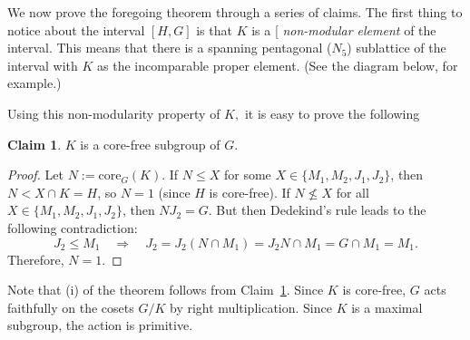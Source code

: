 \documentclass[cm,dissertation,actual,final]{uhthesis}
\theoremstyle{plain}
\theoremstyle{definition}
\newcounter{claim}
\newtheorem{claim}[claim]{Claim}
\theoremstyle{remark}
\numberwithin{theorem}{section}
\numberwithin{claim}{chapter}
\numberwithin{equation}{section}
\numberwithin{conjecture}{chapter}
\newcommand{\<}{\ensuremath{\langle}}
\renewcommand{\>}{\ensuremath{\rangle}}
\renewcommand{\leq}{\ensuremath{\leqslant}}
\renewcommand{\nleq}{\ensuremath{\nleqslant}}
\newcommand{\core}{\ensuremath{\mathrm{core}}}
\newcommand{\0}{\ensuremath{\mathbf{0}}}
\newcommand{\1}{\ensuremath{\mathbf{1}}}
\newcommand{\2}{\ensuremath{\mathbf{2}}}
\newcommand{\3}{\ensuremath{\mathbf{3}}}
\newcommand{\4}{\ensuremath{\mathbf{4}}}
\newcommand{\5}{\ensuremath{\mathbf{5}}}
\newcommand{\indexit}[1]{\index{#1|textit}}
\def\defn#1{\gdef\defnstring{#1}%
  \xdef\dodefnii{{\noexpand\em
       \defnstring}\noexpand\indexit{\defnstring}\noexpand\makeatother}%
  \futurelet\nextthing\dodefn}
\def\dodefn{%
  \ifx\nextthing[\let\next=\dodefni
    \else\let\next=\dodefnii\fi
  \makeatletter
  \next}
\def\dodefni[#1]{%
  {\em\defnstring}%
  \indexit{#1}%
  \makeatother}
\begin{document}
We now prove the foregoing theorem through a series of claims.
The first thing to notice about the interval $[H,G]$ is that
$K$ is a \defn{non-modular element} of the interval.  This means that
there is a spanning pentagonal ($N_5$) sublattice of the interval with $K$ as the
incomparable proper element. (See the diagram below, for example.)
\begin{center}
  {
}
\end{center}
Using this non-modularity property of $K,$ it is easy to 
prove the following
\begin{claim}
\label{claim:K1corefree}
$K$ is a core-free subgroup of $G$.
\end{claim}
\begin{proof}
  Let $N := \core_G(K)$.  If $N \leq X$ for some $X \in \{M_1, M_2, J_1, J_2\}$, 
then $N < X\cap K = H$, so $N = 1$ (since $H$ is core-free).  If
  $N\nleq X$ for all $X \in \{M_1, M_2, J_1, J_2\}$, then $NJ_2 = G$.  But then
Dedekind's rule leads to the following contradiction:
\[
J_2 \leq M_1 \quad \Rightarrow \quad J_2 = J_2(N\cap M_1) = J_2 N \cap M_1 =
G\cap M_1 = M_1.
\]
Therefore, $N = 1$.
\end{proof}
Note that (i) of the theorem follows from Claim~\ref{claim:K1corefree}.  Since
$K$ is core-free, $G$ acts faithfully on the
cosets $G/K$ by right multiplication.  Since $K$ is a maximal subgroup, the
action is primitive.
\end{document}
